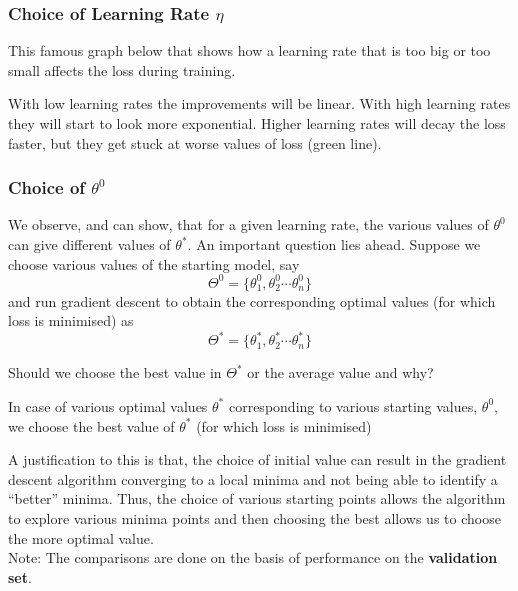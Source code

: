 \documentclass[12pt]{article}
\begin{document}
\subsubsection{Choice of Learning Rate $\eta$}
This famous graph below\cite{class} that shows how a learning rate that is too big or too small affects the loss during training.


With low learning rates the improvements will be linear. With high learning rates they will start to look more exponential. Higher learning rates will decay the loss faster, but they get stuck at worse values of loss (green line).

\subsubsection{Choice of $\theta^0$}
We observe, and can show, that for a given learning rate, the various values of $\theta^0$ can give different values of $\theta^\ast$. An important question lies ahead. Suppose we choose various values of the starting model, say \[\Theta^0 = \{\theta^0_1,\theta^0_2 \cdots \theta^0_n\}\] and run gradient descent to obtain the corresponding optimal values (for which loss is minimised) as \[\Theta^\ast = \{\theta^\ast_1,\theta^\ast_2 \cdots \theta^\ast_n\}\]


Should we choose the best value in $\Theta^\ast$ or the average value and why?

\begin{claim}
In case of various optimal values $\theta^\ast$ corresponding to various starting values, $\theta^0$, we choose the best value of $\theta^\ast$ (for which loss is minimised)
\end{claim}

A justification to this is that, the choice of initial value can result in the gradient descent algorithm converging to a local minima and not being able to identify a ``better'' minima. Thus, the choice of various starting points allows the algorithm to explore various minima points and then choosing the best allows us to choose the more optimal value. \\
Note: The comparisons are done on the basis of performance on the \textbf{validation set}.
\end{document}
